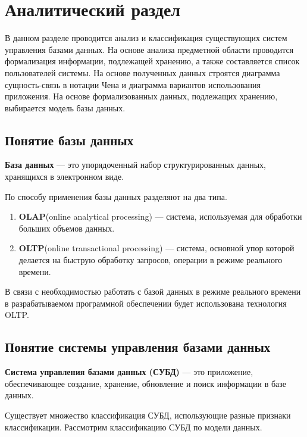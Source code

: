 
\chapter{Аналитический раздел}

В данном разделе проводится анализ и классификация существующих систем управления базами данных. На основе анализа предметной области проводится формализация информации, подлежащей хранению, а также составляется список пользователей системы. На основе полученных данных строятся диаграмма сущность-связь в нотации Чена и диаграмма вариантов использования приложения. На основе формализованных данных, подлежащих хранению, выбирается модель базы данных.

\section{Понятие базы данных}
\textbf{База данных} \cite{db} --- это упорядоченный набор структурированных данных, хранящихся в электронном виде. 

По способу применения базы данных разделяют на два типа.
\begin{enumerate}
	\item \textbf{OLAP}(online analytical processing) \cite{olap} --- система, используемая для обработки больших объемов данных.
	\item \textbf{OLTP}(online transactional processing) \cite{oltp} --- система, основной упор которой делается на быструю обработку запросов, операции в режиме реального времени.
\end{enumerate}

В связи с необходимостью работать с базой данных в режиме реального времени в разрабатываемом программной обеспечении будет использована технология OLTP.

\section{Понятие системы управления базами \newline данных}
\textbf{Система управления базами данных (СУБД)} --- это приложение, обеспечивающее создание, хранение, обновление и поиск информации в базе данных.

Существует множество классификация СУБД, использующие разные признаки классификации. Рассмотрим классификацию СУБД по модели данных.
